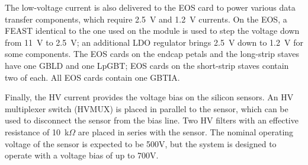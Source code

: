 The low-voltage current is also delivered to the EOS card to power various data transfer components,
which require 2.5~V and 1.2~V currents.
On the EOS, a FEAST identical to the one used on the module is used to step the voltage down from 11~V
to 2.5~V; an additional LDO regulator brings  2.5~V down to 1.2~V for some components.
The EOS cards on the endcap petals and the long-strip staves have one GBLD and one LpGBT;
EOS cards on the short-strip staves contain two of each. All EOS cards contain one GBTIA.

Finally, the HV current provides the voltage bias on the silicon sensors. An HV multiplexer
switch (HVMUX) is placed in parallel to the sensor, which can be used to disconnect the sensor from the
bias line. Two HV filters with an effective resistance of 10~k$\Omega$ are placed in series with the
sensor. The nominal operating voltage of the sensor is expected to be 500V, but the system is designed
to operate with a voltage bias of up to 700V.
